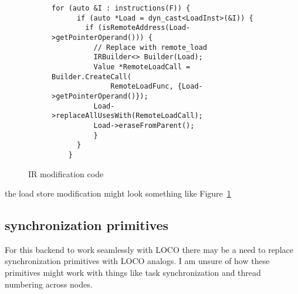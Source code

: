 \documentclass[sigplan,nonacm]{acmart}
\begin{document}
\begin{figure}
    \centering
    \begin{subfigure}{0.45\textwidth}
    \begin{lstlisting}[basicstyle={\ttfamily\scriptsize}]
    for (auto &I : instructions(F)) {
      if (auto *Load = dyn_cast<LoadInst>(&I)) {
        if (isRemoteAddress(Load->getPointerOperand())) {
          // Replace with remote_load
          IRBuilder<> Builder(Load);
          Value *RemoteLoadCall = Builder.CreateCall(
              RemoteLoadFunc, {Load->getPointerOperand()});
          Load->replaceAllUsesWith(RemoteLoadCall);
          Load->eraseFromParent();
          }
      }
    }
    \end{lstlisting}
    \end{subfigure}
    \caption{IR modification code}
    \label{fig:ir-modification}
    \end{figure}

the load store modification might look something like Figure~\ref{fig:ir-modification}



\subsection{synchronization primitives}
For this backend to work seamlessly with LOCO there may be a need to replace 
synchronization primitives with LOCO analogs. I am unsure of how these primitives might 
work with things like task synchronization and thread numbering across nodes.


\end{document}

